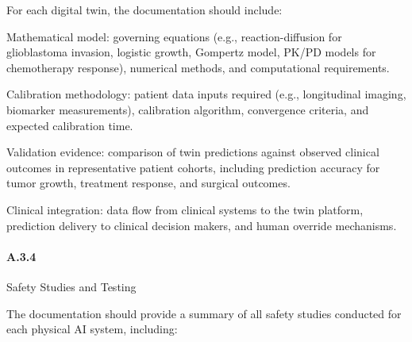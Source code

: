 \documentclass[11pt]{article}
\begin{document}
For each digital twin, the documentation should include:

\begin{description}[leftmargin=2.5cm,style=sameline]

\item[(a)] Mathematical model: governing equations (e.g., reaction-diffusion for glioblastoma invasion, logistic growth, Gompertz model, PK/PD models for chemotherapy response), numerical methods, and computational requirements.

\item[(b)] Calibration methodology: patient data inputs required (e.g., longitudinal imaging, biomarker measurements), calibration algorithm, convergence criteria, and expected calibration time.

\item[(c)] Validation evidence: comparison of twin predictions against observed clinical outcomes in representative patient cohorts, including prediction accuracy for tumor growth, treatment response, and surgical outcomes.

\item[(d)] Clinical integration: data flow from clinical systems to the twin platform, prediction delivery to clinical decision makers, and human override mechanisms.

\end{description}

\paragraph{A.3.4} Safety Studies and Testing

The documentation should provide a summary of all safety studies conducted for each physical AI system, including:
\end{document}
